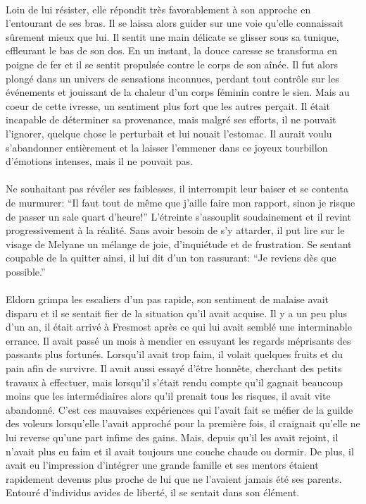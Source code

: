 \paragraph{}
Loin de lui résister, elle répondit très favorablement à son approche en
l'entourant de ses bras. Il se laissa alors guider sur une voie qu'elle
connaissait sûrement mieux que lui. Il sentit une main délicate
se glisser sous sa tunique, effleurant le bas de son dos. En un instant, la
douce caresse se transforma en poigne de fer et il se sentit propulsée contre
le corps de son aînée. Il fut alors plongé dans un univers de sensations
inconnues, perdant tout contrôle sur les événements et jouissant de
la chaleur d'un corps féminin contre le sien. Mais au coeur de cette ivresse,
un sentiment plus fort que les autres perçait. Il était incapable de
déterminer sa provenance, mais malgré ses efforts, il ne pouvait l'ignorer,
quelque chose le perturbait et lui nouait l'estomac. Il aurait voulu
s'abandonner entièrement et la laisser l'emmener dans ce joyeux tourbillon
d'émotions intenses, mais il ne pouvait pas.

\paragraph{}
Ne souhaitant pas révéler ses faiblesses, il interrompit leur baiser et se
contenta de murmurer: ``Il faut tout de même que j'aille faire mon rapport,
sinon je risque de passer un sale quart d'heure!'' L'étreinte s'assouplit
soudainement et il revint progressivement à la réalité. Sans avoir besoin de
s'y attarder, il put lire sur le visage de Melyane un mélange de joie,
d'inquiétude et de frustration. Se sentant coupable de la quitter ainsi, il
lui dit d'un ton rassurant: ``Je reviens dès que possible.''

\paragraph{}
Eldorn grimpa les escaliers d'un pas rapide, son sentiment de malaise avait
disparu et il se sentait fier de la situation qu'il avait acquise. Il y a un
peu plus d'un an, il était arrivé à Fresmost après ce qui lui avait semblé une
interminable errance. Il avait passé un mois à mendier en essuyant les regards
méprisants des passants plus fortunés. Lorsqu'il avait trop faim, il volait
quelques fruits et du pain afin de survivre. Il avait aussi essayé d'être
honnête, cherchant des petits travaux à effectuer, mais lorsqu'il s'était
rendu compte qu'il gagnait beaucoup moins que les intermédiaires alors qu'il
prenait tous les risques, il avait vite abandonné. C'est ces mauvaises
expériences qui l'avait fait se méfier de la guilde des voleurs lorsqu'elle
l'avait approché pour la première fois, il craignait qu'elle ne lui reverse
qu'une part infime des gains. Mais, depuis qu'il les avait rejoint, il n'avait
plus eu faim et il avait toujours une couche chaude ou dormir. De plus, il
avait eu l'impression d'intégrer une grande famille et ses mentors étaient
rapidement devenus plus proche de lui que ne l'avaient jamais été ses parents.
Entouré d'individus avides de liberté, il se sentait dans son élément.

